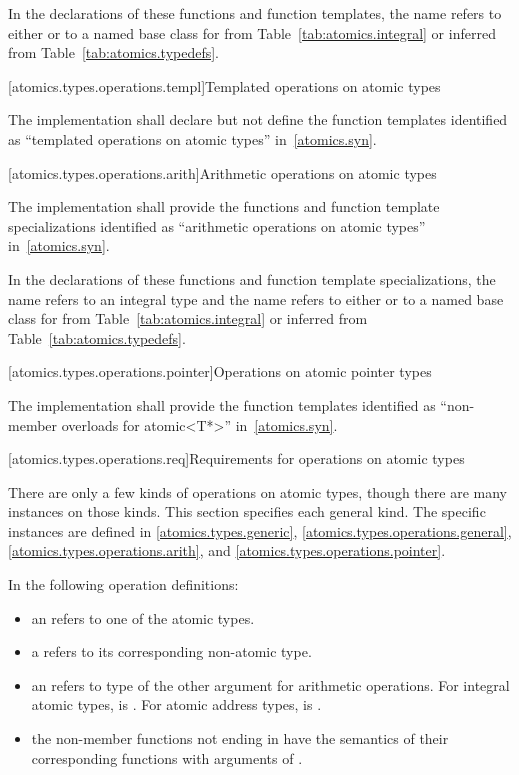 \pnum
In the declarations of these functions and function templates, the name
 refers to either  or to a named base class for 
from Table~\ref{tab:atomics.integral} or inferred from Table~\ref{tab:atomics.typedefs}.

[atomics.types.operations.templ]{Templated operations on atomic types}

\pnum
The implementation shall declare but not define the
function templates identified as ``templated operations on atomic types'' in~\ref{atomics.syn}.

[atomics.types.operations.arith]{Arithmetic operations on atomic types}

\pnum
The implementation shall provide the functions and function template specializations identified as ``arithmetic operations
on atomic types'' in~\ref{atomics.syn}.

%
\pnum
In the declarations of these functions and function template specializations,
the name  refers to an
integral type and the name  refers to either
 or to a named base class for  from
Table~\ref{tab:atomics.integral} or inferred from Table~\ref{tab:atomics.typedefs}.

[atomics.types.operations.pointer]{Operations on atomic pointer types}
%

\pnum
The implementation shall provide the function templates identified as
``non-member overloads for atomic<T*>'' in~\ref{atomics.syn}.

[atomics.types.operations.req]{Requirements for operations on atomic types}

\pnum
There are only a few kinds of operations on atomic types, though there are many
instances on those kinds. This section specifies each general kind. The specific
instances are defined in
\ref{atomics.types.generic}, \ref{atomics.types.operations.general},
\ref{atomics.types.operations.arith}, and \ref{atomics.types.operations.pointer}.

\pnum
In the following operation definitions:

\begin{itemize}
\item an  refers to one of the atomic types.
\item a  refers to its corresponding non-atomic type.
\item an  refers to type of the other argument for arithmetic operations. For
integral atomic types,  is . For atomic address types,  is
.
\item the non-member functions not ending in  have the semantics of their
corresponding  functions with  arguments of
.
\end{itemize}

